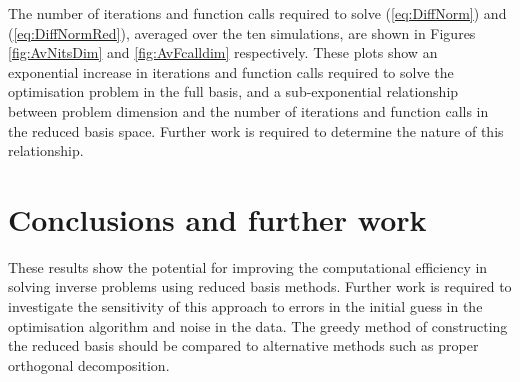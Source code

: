 
The number of iterations and function calls required to solve (\ref{eq:DiffNorm}) and (\ref{eq:DiffNormRed}), averaged over the ten simulations, are shown in Figures \ref{fig:AvNitsDim} and \ref{fig:AvFcalldim} respectively. These plots show an exponential increase in iterations and function calls required to solve the optimisation problem in the full basis, and a sub-exponential relationship between problem dimension and the number of iterations and function calls in the reduced basis space. Further work is required to determine the nature of this relationship.

\section{Conclusions and further work}
These results show the potential for improving the computational efficiency in solving inverse problems using reduced basis methods. Further work is required to investigate the sensitivity of this approach to errors in the initial guess in the optimisation algorithm and noise in the data. The greedy method of constructing the reduced basis should be compared to alternative methods such as proper orthogonal decomposition. 


%
%

                                                                                                      